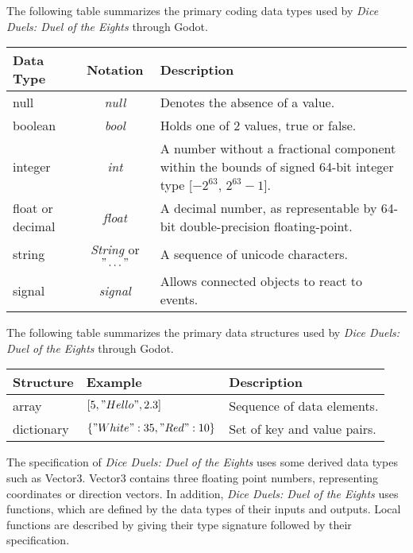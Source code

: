\documentclass[12pt, titlepage]{article}
\begin{document}
The following table summarizes the primary coding data types used by \textit{Dice Duels: Duel of the Eights} through Godot.

\begin{center}
\renewcommand{\arraystretch}{1.2}
\noindent 
\begin{tabular}{p{1.5cm} c p{10cm}} 
\toprule 
\textbf{Data Type} & \textbf{Notation} & \textbf{Description}\\ 
\midrule
null & \textit{null} & Denotes the absence of a value. \\
boolean & \textit{bool} & Holds one of 2 values, true or false.\\
integer & \textit{int} & A number without a fractional component within the bounds of signed 64-bit integer type [$-2^{63}$, $2^{63} - 1$].\\
float or decimal & \textit{float} & A decimal number, as representable by 64-bit double-precision floating-point.\\
string & \textit{String} or $"\dots"$ & A sequence of unicode characters.\\
signal & \textit{signal} & Allows connected objects to react to events.\\
\bottomrule
\end{tabular} 
\end{center}

The following table summarizes the primary data structures used by \textit{Dice Duels: Duel of the Eights} through Godot.

\begin{center}
\renewcommand{\arraystretch}{1.2}
\noindent 
\begin{tabular}{l l l} 
\toprule 
\textbf{Structure} & \textbf{Example} & \textbf{Description}\\ 
\midrule
array & $[5, "Hello", 2.3]$ & Sequence of data elements.\\
dictionary & $\{"White": 35, "Red": 10\}$ & Set of key and value pairs.\\
\bottomrule
\end{tabular} 
\end{center}

\noindent
The specification of \textit{Dice Duels: Duel of the Eights} uses some derived data types such as Vector3. Vector3 contains three floating point numbers, representing coordinates or direction vectors. In addition, \textit{Dice Duels: Duel of the Eights} uses functions, which are defined by the data types of their inputs and outputs. Local functions are described by giving their type signature followed by their specification.
\end{document}
